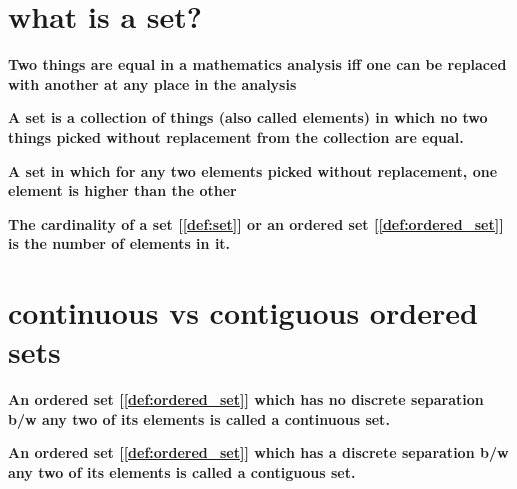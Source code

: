 \documentclass[../main.tex]{subfiles}
\begin{document}
\section{what is a set?}

\begin{definition}
  \label{def:equality}

  \textbf{Two things are equal in a mathematics analysis iff one can be replaced with another at any place in the analysis}

\end{definition}


\begin{definition}
  \label{def:set}

  \textbf{A set is a collection of things (also called elements) in which no two things picked without replacement from the collection are equal.}

\end{definition}

\begin{definition}
  \label{def:ordered_set}

  \textbf{A set in which for any two elements picked without replacement, one element is higher than the other}

\end{definition}

\begin{definition}
  \label{def:set_cardinality}

  \textbf{The cardinality of a set [\ref{def:set}] or an ordered set [\ref{def:ordered_set}] is the number of elements in it.}

\end{definition}

\pagebreak
\section{continuous vs contiguous ordered sets}

\begin{definition}
  \label{def:continuous_set}

  \textbf{An ordered set [\ref{def:ordered_set}] which has no discrete separation b/w any two of its elements is called a continuous set.}

\end{definition}

\begin{definition}
  \label{def:contiguous_set}

  \textbf{An ordered set [\ref{def:ordered_set}] which has a discrete separation b/w any two of its elements is called a contiguous set.}

\end{definition}

\pagebreak
\end{document}
